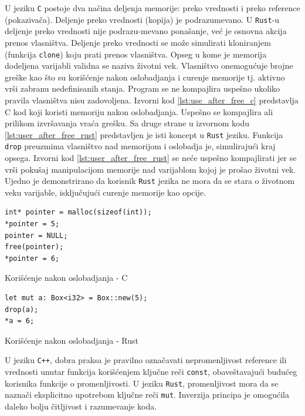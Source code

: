 U jeziku \verb|C| postoje dva načina deljenja 
memorije: preko vrednosti i preko reference (pokazivača). Deljenje preko vrednosti (kopija) je
podrazumevano. U \verb|Rust|-u deljenje preko vrednosti nije podrazu\hyp{}mevano ponašanje, već je osnovna akcija prenos vlasništva.
Deljenje preko vrednosti se može simulirati kloniranjem (funkcija \verb|clone|) koju prati prenos vlasništva.
Opseg u kome je memorija dodeljena varijabli validna 
se naziva životni vek. Vlasništvo onemogućuje brojne greške kao što su korišćenje nakon oslobadjanja i curenje 
memorije tj. aktivno vrši zabranu nedefinisanih stanja. Program se ne kompajlira uspešno ukoliko pravila 
vlasništva nisu zadovoljena. Izvorni kod \ref{lst:use_after_free_c} predstavlja C kod koji koristi memoriju 
nakon oslobadjanja. Uspešno se kompajlira ali prilikom izvršavanja vraća grešku. Sa druge strane u izvornom 
kodu \ref{lst:user_after_free_rust} predstavljen je isti koncept u \verb|Rust| jeziku. Funkcija 
\verb|drop| preuzmima vlasništvo nad memorijom 
i oslobadja je, simulirajući kraj opsega. Izvorni kod \ref{lst:user_after_free_rust} se neće 
uspešno kompajlirati jer se vrši pokušaj manipulacijom memorije nad varijablom kojoj je prošao životni vek.
Ujedno je demonstrirano da korisnik \verb|Rust| jezika ne mora da se stara o životnom veku varijable, isključujući
curenje memorije kao opcije.

\begin{multicols}{2}
    \begin{listing}[H]
    \begin{verbatim}
int* pointer = malloc(sizeof(int));
*pointer = 5;
pointer = NULL;
free(pointer);
*pointer = 6; 
    \end{verbatim}
    \caption{Korišćenje nakon oslobadjanja - C}
    \label{lst:use_after_free_c}
    \end{listing}
    \columnbreak
    \begin{listing}[H]
    \begin{verbatim}
let mut a: Box<i32> = Box::new(5);
drop(a);
*a = 6;
    \end{verbatim}
    \caption{Korišćenje nakon oslobadjanja - Rust}
    \label{lst:user_after_free_rust}
    \end{listing}
\end{multicols}

U jeziku \verb|C++|, dobra praksa je pravilno označavati nepromenljivost reference ili vrednosti
unutar funkcija korišćenjem ključne reči \verb|const|, obaveštavajući budućeg korisnika funkcije 
o promenljivosti. U jeziku \verb|Rust|, promenljivost mora da se naznači eksplicitno upotrebom ključne 
reči \verb|mut|. Inverzija principa je omogućila daleko bolju čitljivost i razumevanje koda.

